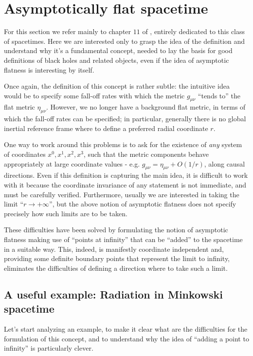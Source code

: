 \section{Asymptotically flat spacetime}
For this section we refer mainly to chapter \(11\) of \cite{wald1991general}, entirely dedicated to this class of spacetimes.
Here we are interested only to grasp the idea of the definition and understand why it's a fundamental concept, needed to lay the basis for good definitions of black holes and related objects, even if the idea of asymptotic flatness is interesting by itself.

Once again, the definition of this concept is rather subtle: the intuitive idea would be to specify some fall-off rates with which the metric \(g_{\mu\nu}\) ``tends to'' the flat metric  \(\eta_{\mu\nu}\). However, we no longer have a background flat metric, in terms of which the fall-off rates can be specified; in particular, generally there is no global inertial reference frame where to define a preferred radial coordinate \(r\).

One way to work around this problems is to ask for the existence of \emph{any} system of coordinates \(x^0, x^1, x^2, x^3\), such that the metric components behave appropriately at large coordinate values - e.g. \(g_{\mu\nu} = \eta_{\mu\nu} + O(1/r)\), along causal directions.
Even if this definition  is capturing the main idea, it is difficult to work with it because the coordinate invariance of any statement is not immediate, and must be carefully verified.
Furthermore, usually we are interested in taking the limit ``\(r \rightarrow +\infty\)'', but the above notion of asymptotic flatness does not specify precisely how such limits are to be taken.

These difficulties have been solved by formulating the notion of asymptotic flatness making use of ``points at infinity'' that can be ``added'' to the spacetime in a suitable way. This, indeed, is manifestly coordinate independent and, providing some definite boundary points that represent the limit to infinity, eliminates the difficulties of defining a direction where to take such a limit.

\subsection{A useful example: Radiation in Minkowski spacetime}
Let's start analyzing an example, to make it clear what are the difficulties for the formulation of this concept, and to understand why the idea of ``adding a point to infinity'' is particularly clever.

